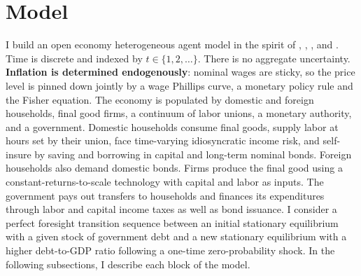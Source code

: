 \begin{abstract}
\noindent This document restates the model of the paper with the exogenous
inflation assumption removed. Inflation is now determined inside the model by a
sticky-wage block: a continuum of labor unions set nominal wages subject to a
quadratic adjustment cost, households supply hours under proportional rationing,
and a monetary authority follows a Taylor rule. Sections
\ref{model}--\ref{calibration} are the model, equilibrium and calibration;
Sections \ref{results}--\ref{decomposition} report the counterfactual results
under the extension, together with a decomposition of the one channel that the
extension adds and the flexible-wage model does not have.
\end{abstract}

\section{Model} \label{model}

I build an open economy heterogeneous agent model in the spirit of
\textcite{Bewley-77}, \textcite{Imrohoroglu-89}, \textcite{Aiyagari-94}, and
\textcite{Huggett-1996}. Time is discrete and indexed by $t\in\{1,2,\dots\}$.
There is no aggregate uncertainty. \textbf{Inflation is determined
endogenously}: nominal wages are sticky, so the price level is pinned down
jointly by a wage Phillips curve, a monetary policy rule and the Fisher
equation. The economy is populated by domestic and foreign households, final
good firms, a continuum of labor unions, a monetary authority, and a government.
Domestic households consume final goods, supply labor at hours set by their
union, face time-varying idiosyncratic income risk, and self-insure by saving
and borrowing in capital and long-term nominal bonds. Foreign households also
demand domestic bonds. Firms produce the final good using a
constant-returns-to-scale technology with capital and labor as inputs. The
government pays out transfers to households and finances its expenditures
through labor and capital income taxes as well as bond issuance. I consider a
perfect foresight transition sequence between an initial stationary equilibrium
with a given stock of government debt and a new stationary equilibrium with a
higher debt-to-GDP ratio following a one-time zero-probability shock. In the
following subsections, I describe each block of the model.

